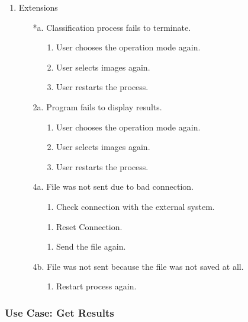 \documentclass[parskip=full]{scrartcl}
\begin{document}
\begin{enumerate}
	\item Extensions
	\begin{itemize} [nosep]
		\item[*a.] Classification process fails to terminate.
		\begin{itemize} [nosep]
			\item[1.] User chooses the operation mode again.
			\item[2.] User selects images again.
			\item[3.] User restarts the process.
		\end{itemize}
		\item[2a.] Program fails to display results.
		\begin{itemize} [nosep]
			\item[1.] User chooses the operation mode again.
			\item[2.] User selects images again.
			\item[3.] User restarts the process.
		\end{itemize}
		\item[4a.] File was not sent due to bad connection.
		\begin{itemize} [nosep]
			\item[1.] Check connection with the external system.
			\item[1.] Reset Connection.
			\item[1.] Send the file again.
		\end{itemize}
		\item[4b.] File was not sent because the file was not saved at all.
		\begin{itemize} [nosep]
			\item[1.] Restart process again.
		\end{itemize}
	\end{itemize}
\end{enumerate}

\pagebreak

\subsubsection {Use Case: Get Results}
\end{document}
